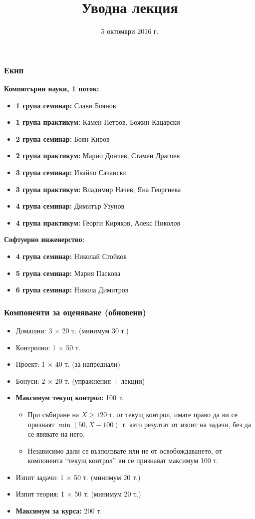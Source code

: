 \documentclass{beamer}
\title{Уводна лекция}
\date{5 октомври 2016 г.}
\begin{document}
\begin{frame}
  \titlepage
\end{frame}

\begin{frame}
  \frametitle{Екип}

  \textbf{Компютърни науки, 1 поток:}
  \begin{itemize}
  \item \textbf{1 група семинар:} Слави Боянов
  \item \textbf{1 група практикум:} Камен Петров, Божин Кацарски
  \item \textbf{2 група семинар:} Боян Киров
  \item \textbf{2 група практикум:} Марио Дончев, Стамен Драгоев
  \item \textbf{3 група семинар:} Ивайло Сачански
  \item \textbf{3 група практикум:} Владимир Начев, Яна Георгиева
  \item \textbf{4 група семинар:} Димитър Узунов
  \item \textbf{4 група практикум:} Георги Киряков, Алекс Николов
  \end{itemize}
  \textbf{Софтуерно инженерство:}
  \begin{itemize}
  \item \textbf{4 група семинар:} Николай Стойков
  \item \textbf{5 група семинар:} Мария Паскова
  \item \textbf{6 група семинар:} Никола Димитров
  \end{itemize}
\end{frame}

\begin{frame}
  \frametitle{Компоненти за оценяване (обновени)}
  
  \begin{itemize}
  \item Домашни: 3 $\times$ 20 т. \alert{(минимум 30 т.)}
  \item Контролно: 1 $\times$ 50 т.
  \item Проект: 1 $\times$ 40 т. (за напреднали)
  \item Бонуси: 2 $\times$ 20 т. (упражнения + лекции)
  \item \textbf{Максимум текущ контрол:} 100 т.
    \begin{itemize}
    \item При събиране на $X \geq 120$ т. от текущ контрол, имате право да ви се признаят $\min(50, X - 100)$ т. като резултат от изпит на задачи, без да се явявате на него.
    \item Независимо дали се възползвате или не от освобождаването, от компонента ``текущ контрол'' ви се признават максимум 100 т.
    \end{itemize}
  \item Изпит задачи: 1 $\times$ 50 т. \alert{(минимум 20 т.)}
  \item Изпит теория: 1 $\times$ 50 т. \alert{(минимум 20 т.)}
  \item \textbf{Максимум за курса:} 200 т.
  \end{itemize}
\end{frame}
\end{document}
